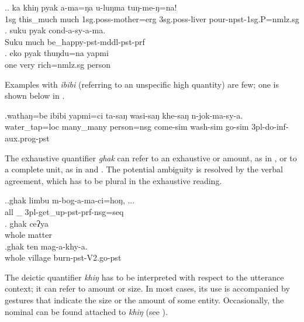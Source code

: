 \ex.\ag.   ka  khiŋ     pyak  a-ma=ŋa   u-luŋma   tuŋ-me-ŋ=na!\\
{\sc 1sg} this\_much much {\sc 1sg.poss-}mother{\sc =erg} {\sc 3sg.poss-}liver pour{\sc -npst-1sg.P=nmlz.sg}\\
  
\bg. suku   pyak  cond-a-sy-a-ma.\\
Suku much be\_happy{\sc [3sg]-pst-mddl-pst-prf}\\
  
\bg.   eko pyak thuŋdu=na        yapmi\\
one very rich{\sc =nmlz.sg} person\\
  

Examples with \emph{ibibi} (referring to an unspecific high quantity) are few; one is shown below in \Next.

\exg.wathaŋ=be      ibibi     yapmi=ci     ta-saŋ        wasi-saŋ        khe-saŋ        n-jok-ma-sy-a.\\
water\_tap{\sc =loc} many\_many person{\sc =nsg} come{\sc -sim} wash{\sc -sim} go{\sc -sim} {\sc 3pl-}do{\sc -inf-aux.prog-pst}\\
 

The exhaustive quantifier \emph{ghak}  can refer to an exhaustive  or amount, as in  \Next[a], or to a complete unit, as in \Next[b] and  \Next[c]. The potential ambiguity is resolved by the verbal  agreement, which has to be plural in the exhaustive reading.

\ex.\ag.ghak limbu          m-bog-a-ma-ci=hoŋ, ...\\
all \_ {\sc 3pl-}get\_up{\sc -pst-prf-nsg=seq}\\
  
\bg. ghak  ceʔya \\
whole matter\\
  
\bg.ghak ten     mag-a-khy-a.\\
whole village burn{\sc [3sg]-pst-V2.go-pst}\\
  

The deictic quantifier \emph{khiŋ} has to be interpreted with respect to the utterance context; it can  refer to  amount or size. In most cases, its use is accompanied by  gestures that indicate the size or the amount of some entity. Occasionally,  the nominal  can be found attached to \emph{khiŋ}  (see \Next[c]).

